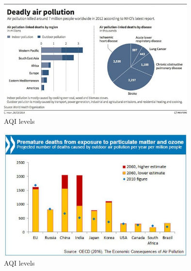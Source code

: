 \begin{figure}[h]
\centering
  \includegraphics[width=100mm]{site_survey1.jpg}
  \caption{AQI levels}
  \label{fig:AQI levels}
\end{figure}

\begin{figure}[h]
\centering
  \includegraphics[width=100mm]{site_survey2.jpg}
  \caption{AQI levels}
  \label{fig:AQI levels}
\end{figure}

